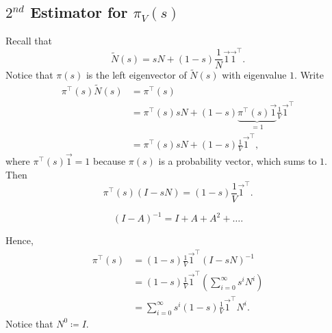 \subsection{\(2^{nd}\) Estimator for \(\pi_V(s)\)}
Recall that
\[
	\widetilde{N}(s) = sN+(1-s)\frac{1}{N}\vec{1}\vec{1}^{\top}.
\]
Notice that \(\pi(s)\) is the left eigenvector of \(\widetilde{N}(s)\) with eigenvalue \(1\). Write
\[
	\begin{split}
		\pi^{\top}(s)\widetilde{N}(s) &= \pi^{\top}(s) \\
		&= \pi^{\top}(s)sN+(1 - s)\underbrace{\pi^{\top}(s)\vec{1}}_{ = 1}\frac{1}{V}\vec{1}^{\top}\\
		&= \pi^{\top}(s)sN+(1 - s)\frac{1}{V}\vec{1}^{\top},
	\end{split}
\]
where \(\pi^{\top}(s)\vec{1} = 1\) because \(\pi(s)\) is a probability vector, which sums to \(1\). Then
\[
	\pi^{\top}(s)(I - sN) = (1 - s)\frac{1}{V}\vec{1}^{\top}.
\]
\begin{prev}
	\[
		(I - A)^{-1} = I + A + A^2 + \ldots .
	\]
\end{prev}
Hence,
\[
	\begin{split}
		\pi^{\top}(s) &= (1 - s)\frac{1}{V}\vec{1}^{\top}(I - sN)^{-1}\\
		&= (1 - s)\frac{1}{V}\vec{1}^{\top}\left(\sum\limits_{i=0}^{\infty} s^i N^i\right)\\
		&= \sum\limits_{i=0}^{\infty} s^i (1 - s)\frac{1}{V}\vec{1}^{\top}N^i.
	\end{split}
\]
Notice that \(N^0\coloneqq I\).

